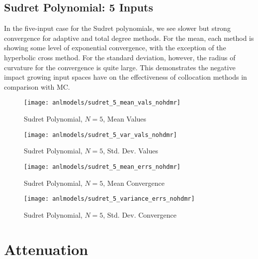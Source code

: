\subsection{Sudret Polynomial: 5 Inputs}
In the five-input case for the Sudret polynomials, we see slower but strong convergence for adaptive and
total degree methods.
For the mean, each method is showing some level of exponential convergence, with the exception of the
hyperbolic cross method.  For the standard deviation,
however, the radius of curvature for the convergence is quite large.  This demonstrates the negative impact
growing input spaces have on the effectiveness of collocation methods in comparison with MC.
\begin{figure}[H]
  \centering
  \texttt{[image: anlmodels/sudret\_5\_mean\_vals\_nohdmr]}
  \caption{Sudret Polynomial, $N=5$, Mean Values}
  \label{fig:sudretpoly mean values 5}
\end{figure}
\begin{figure}[H]
  \centering
  \texttt{[image: anlmodels/sudret\_5\_var\_vals\_nohdmr]}
  \caption{Sudret Polynomial, $N=5$, Std. Dev. Values}
  \label{fig:sudretpoly var values 5}
\end{figure}

\begin{figure}[H]
  \centering
  \texttt{[image: anlmodels/sudret\_5\_mean\_errs\_nohdmr]}
  \caption{Sudret Polynomial, $N=5$, Mean Convergence}
  \label{fig:sudretpoly mean errors 5}
\end{figure}
\begin{figure}[H]
  \centering
  \texttt{[image: anlmodels/sudret\_5\_variance\_errs\_nohdmr]}
  \caption{Sudret Polynomial, $N=5$, Std. Dev. Convergence}
  \label{fig:sudretpoly var errors 5}
\end{figure}


\section{Attenuation}

